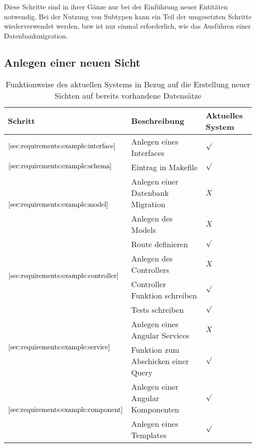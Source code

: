 Diese Schritte sind in ihrer Gänze nur bei der Einführung neuer Entitäten notwendig.
Bei der Nutzung von Subtypen kann ein Teil der umgesetzten Schritte wiederverwendet werden,
bzw ist nur einmal erforderlich, wie das Ausführen einer Datenbankmigration.

\subsection{Anlegen einer neuen Sicht}
\label{sec:requirements:example:newview}

\begin{table}[h!]
	\begin{tabular}{|p{}|p{}|p{}|}
		\hline
		\textbf{Schritt} & \textbf{Beschreibung} & \textbf{Aktuelles \newline System} \\ \hline
		$\ref{sec:requirements:example:interface}$ & Anlegen eines Interfaces & $\surd$  \\ \hline
		$\ref{sec:requirements:example:schema}$ & Eintrag in Makefile & $\surd$\\ \hline
		\multirow{2}{*}{$\ref{sec:requirements:example:model}$}
		& Anlegen einer Datenbank Migration & $X$  \\
		& Anlegen des Models & $X$ \\ \hline
		\multirow{4}{*}{$\ref{sec:requirements:example:controller}$}
		& Route definieren & $\surd$  \\
		& Anlegen des Controllers & $X$  \\
		& Controller Funktion schreiben & $\surd$  \\
		& Tests schreiben & $\surd$  \\ \hline
		\multirow{2}{*}{$\ref{sec:requirements:example:service}$}
		& Anlegen eines Angular Services & $X$  \\
		& Funktion zum Abschicken einer Query & $\surd$  \\ \hline
		\multirow{2}{*}{$\ref{sec:requirements:example:component}$}
		& Anlegen einer Angular Komponenten & $\surd$  \\
		& Anlegen eines Templates & $\surd$  \\ \hline
	\end{tabular}
	\vspace{5pt}
	\centering
	\caption{Funktionweise des aktuellen Systems in Bezug auf die Erstellung neuer Sichten auf bereits vorhandene Datensätze}
	\label{tbl:newview}
\end{table}

